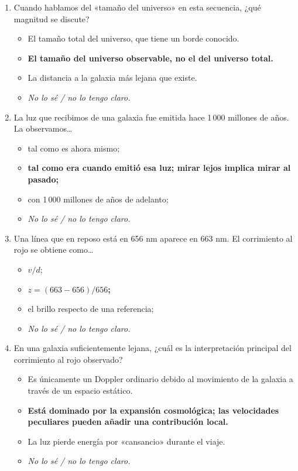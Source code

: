 \begin{enumerate}[leftmargin=*]
\item Cuando hablamos del «tamaño del universo» en esta secuencia, ¿qué magnitud se discute?
\begin{itemize}
\item El tamaño total del universo, que tiene un borde conocido.
\item \textbf{El tamaño del universo observable, no el del universo total.}
\item La distancia a la galaxia más lejana que existe.
\item \textit{No lo sé / no lo tengo claro.}
\end{itemize}

\item La luz que recibimos de una galaxia fue emitida hace 1\,000 millones de años. La observamos\ldots
\begin{itemize}
\item tal como es ahora mismo;
\item \textbf{tal como era cuando emitió esa luz; mirar lejos implica mirar al pasado;}
\item con 1\,000 millones de años de adelanto;
\item \textit{No lo sé / no lo tengo claro.}
\end{itemize}

\item Una línea que en reposo está en 656 nm aparece en 663 nm. El corrimiento al rojo se obtiene como\ldots
\begin{itemize}
\item $v/d$;
\item \textbf{$z=(663-656)/656$;}
\item el brillo respecto de una referencia;
\item \textit{No lo sé / no lo tengo claro.}
\end{itemize}

\item En una galaxia suficientemente lejana, ¿cuál es la interpretación principal del corrimiento al rojo observado?
\begin{itemize}
\item Es únicamente un Doppler ordinario debido al movimiento de la galaxia a través de un espacio estático.
\item \textbf{Está dominado por la expansión cosmológica; las velocidades peculiares pueden añadir una contribución local.}
\item La luz pierde energía por «cansancio» durante el viaje.
\item \textit{No lo sé / no lo tengo claro.}
\end{itemize}


\end{enumerate}
